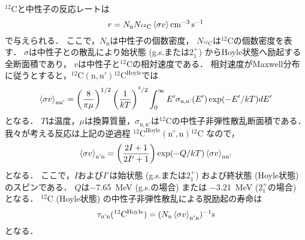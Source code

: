 \documentclass[../master]{subfiles}
\begin{document}
${}^{12}\mathrm{C}$と中性子の反応レートは
\begin{equation}
  r = N_{\text{n}}N_{{}^{12}\mathrm{C}}\braket{\sigma v} \si{\per\cubic\centi\metre\per\second}
  \label{eq::r}
\end{equation}
で与えられる．
ここで，$N_{\text{n}}$は中性子の個数密度，
$N_{{}^{12}\mathrm{C}}$は${}^{12}\mathrm{C}$の個数密度を表す．
$\sigma$は中性子との散乱により始状態 (g.s.または$2_{1}^{+}$) からHoyle状態へ励起する全断面積であり，
$v$は中性子と${}^{12}\mathrm{C}$の相対速度である．
相対速度がMaxwell分布に従うとすると，${}^{12}\mathrm{C}(\mathrm{n},\mathrm{n'}){}^{12}\mathrm{C}^{\text{Hoyle}}$では
\begin{equation}
  \braket{\sigma v}_{\text{nn'}} =
  \left(\frac{8}{\pi\mu}\right)^{1/2}\left(\frac{1}{kT}\right)^{^3/2}
  \int^{\infty}_{0}E'\sigma_{\text{n,n'}}(E')\exp(-E'/kT)dE'
  \label{eq::sigmann'}
\end{equation}
となる．
$T$は温度，$\mu$は換算質量，$\sigma_{\mathrm{n},\mathrm{n}'}$は${}^{12}\mathrm{C}$の中性子非弾性散乱断面積である．
我々が考える反応は上記の逆過程 ${}^{12}\mathrm{C}^{{\text{Hoyle}}}(\mathrm{n}',\mathrm{n}){}^{12}\mathrm{C}$ なので，
\begin{equation}
  \braket{\sigma v}_{\text{n'n}} = \left(\frac{2I+1}{2I'+1}\right)
  \exp(-Q/kT)\braket{\sigma v}_{\text{nn'}}
  \label{eq::sigman'n}
\end{equation}
となる．
ここで，$I$および$I'$は始状態 (g.s.または$2_{1}^{+}$)
および終状態 (Hoyle状態) のスピンである．
$Q$は\SI{-7.65}{\mega\electronvolt} (g.s.の場合) または
\SI{-3.21}{\mega\electronvolt} ($2_{1}^{+}$の場合) となる．
${}^{12}\mathrm{C}$ (Hoyle状態) の中性子非弾性散乱による脱励起の寿命は
\begin{equation}
  \tau_{\text{n'n}}({}^{12}\mathrm{C}^{{\text{Hoyle}}}) =
  (N_{\text{n}}\braket{\sigma v}_{\rm n'n})^{-1} \si{\second}
  \label{eq::tau}
\end{equation}
となる．
\end{document}
